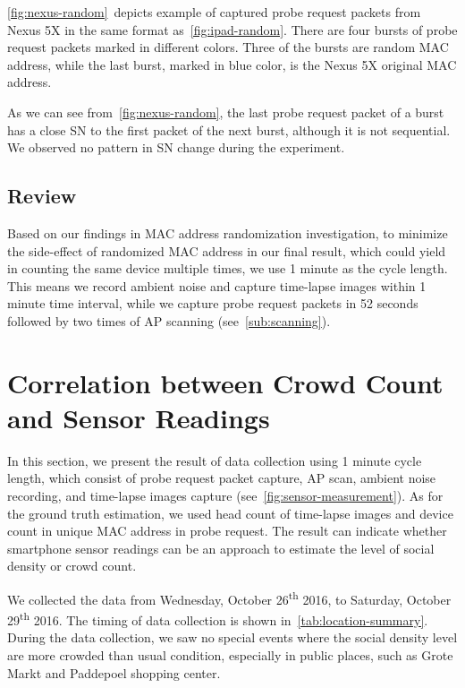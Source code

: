 	\autoref{fig:nexus-random}~depicts example of captured probe request packets from Nexus 5X in the same format as~\autoref{fig:ipad-random}. There are four bursts of probe request packets marked in different colors. Three of the bursts are random \ac{MAC} address, while the last burst, marked in blue color, is the Nexus 5X original \ac{MAC} address.

	As we can see from~\autoref{fig:nexus-random}, the last probe request packet of a burst has a close \ac{SN} to the first packet of the next burst, although it is not sequential. We observed no pattern in \ac{SN} change during the experiment.

	\subsection{Review} %
	\label{sub:review}
	Based on our findings in \ac{MAC} address randomization investigation, to minimize the side-effect of randomized \ac{MAC} address in our final result, which could yield in counting the same device multiple times, we use 1 minute as the cycle length. This means we record ambient noise and capture time-lapse images within 1 minute time interval, while we capture probe request packets in 52 seconds followed by two times of \ac{AP} scanning (see~\autoref{sub:scanning}).



\section{Correlation between Crowd Count and Sensor Readings} %
\label{sec:crowd_count_correlation-result}
In this section, we present the result of data collection using 1 minute cycle length, which consist of probe request packet capture, \ac{AP} scan, ambient noise recording, and time-lapse images capture (see~\autoref{fig:sensor-measurement}). As for the ground truth estimation, we used head count of time-lapse images and device count in unique \ac{MAC} address in probe request. The result can indicate whether smartphone sensor readings can be an approach to estimate the level of social density or crowd count.

We collected the data from Wednesday, October 26\textsuperscript{th} 2016, to Saturday, October 29\textsuperscript{th} 2016. The timing of data collection is shown in~\autoref{tab:location-summary}. During the data collection, we saw no special events where the social density level are more crowded than usual condition, especially in public places, such as Grote Markt and Paddepoel shopping center.

